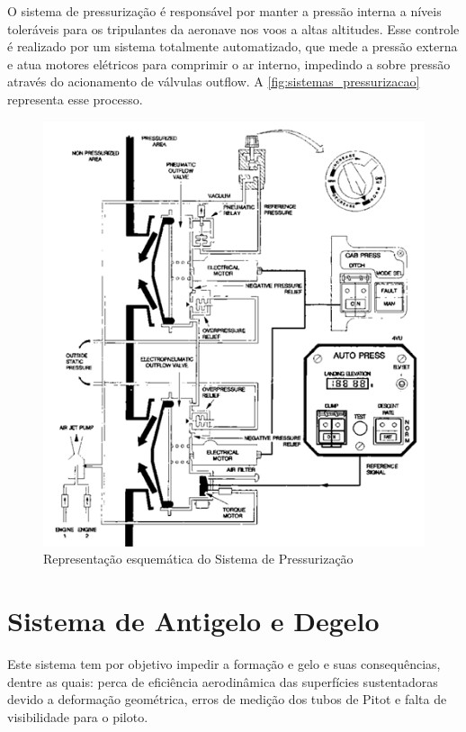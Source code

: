 O sistema de pressurização é responsável por manter a pressão interna a níveis toleráveis para os tripulantes da aeronave nos voos a altas altitudes.
Esse controle é realizado por um sistema totalmente automatizado, que mede a pressão externa e atua motores elétricos para comprimir o ar interno, impedindo a sobre pressão através do acionamento de válvulas outflow.
A \autoref{fig:sistemas_pressurizacao} representa esse processo.

\begin{figure}
\includegraphics[width=\textwidth]{images/parte3/sistemas_pressurizacao.png}
\caption{Representação esquemática do Sistema de Pressurização}
\label{fig:sistemas_pressurizacao}
\end{figure}


\section{Sistema de Antigelo e Degelo}

Este sistema tem por objetivo impedir a formação e gelo e suas consequências, dentre as quais: perca de eficiência aerodinâmica das superfícies sustentadoras devido a deformação geométrica, erros de medição dos tubos de Pitot e falta de visibilidade para o piloto.


